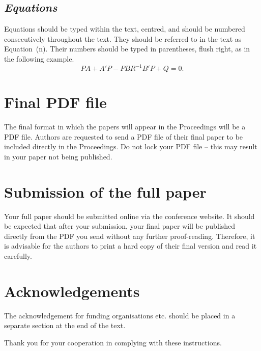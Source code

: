\documentclass[12pt]{IET02}
\begin{document}
\subsection{\it Equations}

Equations should be typed within the text, centred, and should be numbered
consecutively throughout the text. They should be referred to in the text as
Equation~(n). Their numbers should be typed in parentheses, flush right, as
in the following example.
\begin{equation}
PA + A'P - PBR^{-1}B'P + Q = 0.
\end{equation}

\section{Final PDF file}

The final format in which the papers will appear in the Proceedings will be
a PDF file. Authors are requested to send a PDF file of their final paper to
be included directly in the Proceedings. Do not lock your PDF file -- this
may result in your paper not being published.

\section{Submission of the full paper}

Your full paper should be submitted online via the conference website. It
should be expected that after your submission, your final paper will be
published directly from the PDF you send without any further proof-reading.
Therefore, it is advisable for the authors to print a hard copy of their
final version and read it carefully.

\section*{Acknowledgements}

The acknowledgement for funding organisations etc. should be placed in a
separate section at the end of the text.

Thank you for your cooperation in complying with these instructions.






\end{document}
